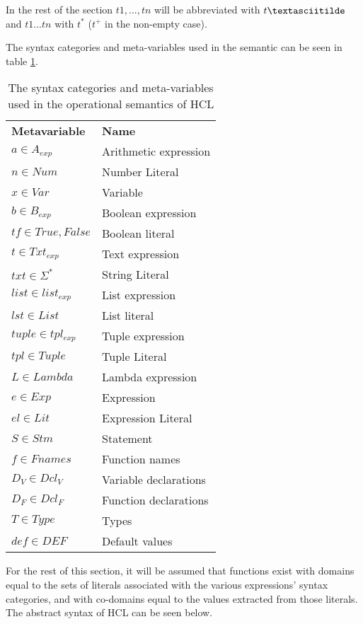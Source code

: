 In the rest of the section $t1, .
.
.
 , tn$ will be abbreviated with $t\textasciitilde$ and $t1 .
 .
 .
  tn$ with $t^*$ ($t^+$ in the non-empty case).

The syntax categories and meta-variables used in the semantic can be seen in table \ref{tab:metaVar}. 
\begin{center}
	\begin{table}[H]
		\centering
		\caption{The syntax categories and meta-variables used in the operational semantics of HCL}
		\label{tab:metaVar}
		\begin{tabular}{ll}
			\textbf{Metavariable} & \textbf{Name} \\
			$a \in A_{exp}$ 	  & Arithmetic expression \\
			$n \in Num$			  & Number Literal \\
			$x \in Var$           & Variable \\
			$b \in B_{exp}$		  & Boolean expression\\ 
			$tf \in {True,False}$ & Boolean literal \\
			$t \in Txt_{exp}$     & Text expression\\
			$txt \in {\Sigma^*}$  & String Literal \\
			$list \in list_{exp}$ & List expression \\
			$lst \in List$		  & List literal\\
			$tuple \in tpl_{exp}$ & Tuple expression\\
			$tpl \in Tuple$	      & Tuple Literal\\
			$L \in Lambda$		  & Lambda expression\\
			$e \in Exp$			  & Expression\\
			$el \in Lit$		  & Expression Literal\\
			$S \in Stm$           & Statement\\
			$f \in Fnames$ 		  & Function names\\
			$D_V \in Dcl_V$		  & Variable declarations\\
			$D_F \in Dcl_F$       & Function declarations\\
			$T \in Type$          & Types\\
			$def \in DEF$		  & Default values
		\end{tabular}
	\end{table}
\end{center}

For the rest of this section, it will be assumed that functions exist with domains equal to the sets of literals associated with the various expressions' syntax categories, and with co-domains equal to the values extracted from those literals.
The abstract syntax of HCL can be seen below.

